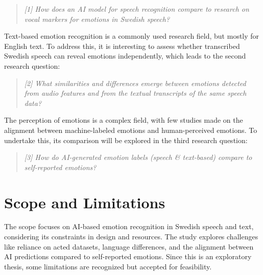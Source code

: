 \begin{quote}
\textit{[1] How does an AI model for speech recognition compare to research on vocal markers for emotions in Swedish speech?} 
\end{quote}
Text-based emotion recognition is a commonly used research field, but mostly for English text. To address this, it is interesting to assess whether transcribed Swedish speech can reveal emotions independently, which leads to the second research question: 
\begin{quote}
    \textit{[2] What similarities and differences emerge between emotions detected from audio features and from the textual transcripts of the same speech data? }
\end{quote}
The perception of emotions is a complex field, with few studies made on the alignment between machine-labeled emotions and human-perceived emotions. To undertake this, its comparison will be explored in the third research question:  
\begin{quote}
    \textit{[3] How do AI-generated emotion labels (speech \& text-based) compare to self-reported emotions?}
\end{quote}

\section{Scope and Limitations}
The scope focuses on AI-based emotion recognition in Swedish speech and text, considering its constraints in design and resources. The study explores challenges like reliance on acted datasets, language differences, and the alignment between AI predictions compared to self-reported emotions. Since this is an exploratory thesis, some limitations are recognized but accepted for feasibility. 
